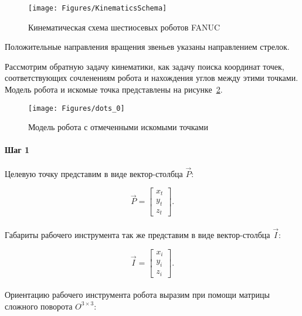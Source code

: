 \begin{figure}[H]
    \centering
    \vspace{14pt}
    \texttt{[image: Figures/KinematicsSchema]}
    \caption{Кинематическая схема шестиосевых роботов FANUC}
    \label{fig:KinematicsSchema}
\end{figure}

Положительные направления вращения звеньев указаны направлением стрелок.

Рассмотрим обратную задачу кинематики, как задачу поиска координат точек, соответствующих сочленениям робота и нахождения углов между этими точками.
Модель робота и искомые точка представлены на рисунке~\ref{fig:ikp:dots_0}.

\begin{figure}[H]
    \centering
    \vspace{14pt}
    \texttt{[image: Figures/dots\_0]}
    \caption{Модель робота с отмеченными искомыми точками}
    \label{fig:ikp:dots_0}
\end{figure}

\paragraph{Шаг 1}

Целевую точку представим в виде вектор-столбца $\overrightarrow{P}$:

\begin{equation*}
    \overrightarrow{P} =
    \begin{bmatrix}
        x_t \\
        y_t \\
        z_t
    \end{bmatrix}.
\end{equation*} \\

Габариты рабочего инструмента так же представим в виде вектор-столбца $\overrightarrow{I}$:

\begin{equation*}
    \overrightarrow{I} =
    \begin{bmatrix}
        x_i \\
        y_i \\
        z_i
    \end{bmatrix}.
\end{equation*} \\

Ориентацию рабочего инструмента робота выразим при помощи матрицы сложного поворота $O^{3\times3}$:

